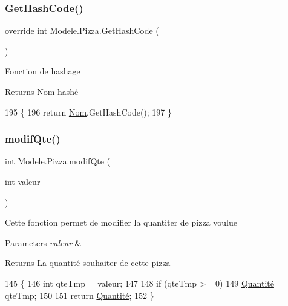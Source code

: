 \subsubsection{\texorpdfstring{Get\+Hash\+Code()}{GetHashCode()}}
{\footnotesize\ttfamily override int Modele.\+Pizza.\+Get\+Hash\+Code (\begin{DoxyParamCaption}{ }\end{DoxyParamCaption})\hspace{0.3cm}{\ttfamily [inline]}}



Fonction de hashage 

\begin{DoxyReturn}{Returns}
Nom hashé
\end{DoxyReturn}

\begin{DoxyCode}
195         \{
196             \textcolor{keywordflow}{return} \hyperlink{classModele_1_1Pizza_acd4ac908946cc662e4d4dc6e77b302d1}{Nom}.GetHashCode();
197         \}
\end{DoxyCode}
\mbox{\label{classModele_1_1Pizza_a86b98da27e7ada45355e8576792d75c5}} 
\subsubsection{\texorpdfstring{modif\+Qte()}{modifQte()}}
{\footnotesize\ttfamily int Modele.\+Pizza.\+modif\+Qte (\begin{DoxyParamCaption}\item[{int}]{valeur }\end{DoxyParamCaption})\hspace{0.3cm}{\ttfamily [inline]}}



Cette fonction permet de modifier la quantiter de pizza voulue 


\begin{DoxyParams}{Parameters}
{\em valeur} & \\
\hline
\end{DoxyParams}
\begin{DoxyReturn}{Returns}
La quantité souhaiter de cette pizza
\end{DoxyReturn}

\begin{DoxyCode}
145        \{
146             \textcolor{keywordtype}{int} qteTmp = valeur;
147 
148             \textcolor{keywordflow}{if} (qteTmp >= 0)
149                 \hyperlink{classModele_1_1Pizza_ae755ca79feb6f9a522aa18544c3f1310}{Quantité} = qteTmp;
150 
151             \textcolor{keywordflow}{return} \hyperlink{classModele_1_1Pizza_ae755ca79feb6f9a522aa18544c3f1310}{Quantité};
152        \}
\end{DoxyCode}
\mbox{\label{classModele_1_1Pizza_a5bcf4dd5b39ed12e3085aa2c92e9d33b}} 
